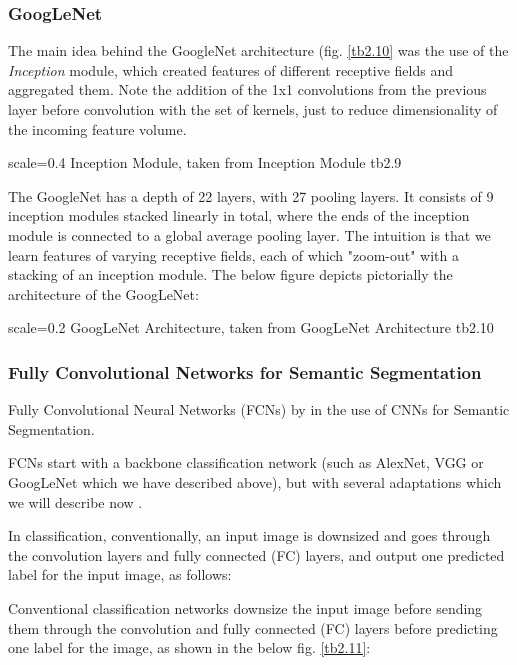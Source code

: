 \subsubsection{GoogLeNet}

The main idea behind the GoogleNet architecture (fig. \ref{tb2.10} was the use of the \emph{Inception} module, which created features of different receptive fields and aggregated them. Note the addition of the 1x1 convolutions from the previous layer before convolution with the set of kernels, just to reduce dimensionality of the incoming feature volume. 

{scale=0.4}%
{Inception Module, taken from \cite{Szegedy2015}}%
{Inception Module}%
{tb2.9} %

The GoogleNet has a depth of 22 layers, with 27 pooling layers. It consists of 9 inception modules stacked linearly in total, where the ends of the inception module is connected to a global average pooling layer. The intuition is that we learn features of varying receptive fields, each of which "zoom-out" with a stacking of an inception module. The below figure depicts pictorially the architecture of the GoogLeNet:

{scale=0.2}%
{GoogLeNet Architecture, taken from \cite{Karri2017}}%
{GoogLeNet Architecture}%
{tb2.10} %

\subsubsection{Fully Convolutional Networks for Semantic Segmentation}
Fully Convolutional Neural Networks (FCNs) by \cite{long2015} in the use of CNNs for Semantic Segmentation.  

FCNs start with a backbone classification network (such as AlexNet, VGG or GoogLeNet which we have described above), but with several adaptations which we will describe now . 

In classification, conventionally, an input image is downsized and goes through the convolution layers and fully connected (FC) layers, and output one predicted label for the input image, as follows:

Conventional classification networks downsize the input image before sending them through the convolution and fully connected (FC) layers before predicting one label for the image, as shown in the below fig. \ref{tb2.11}:

